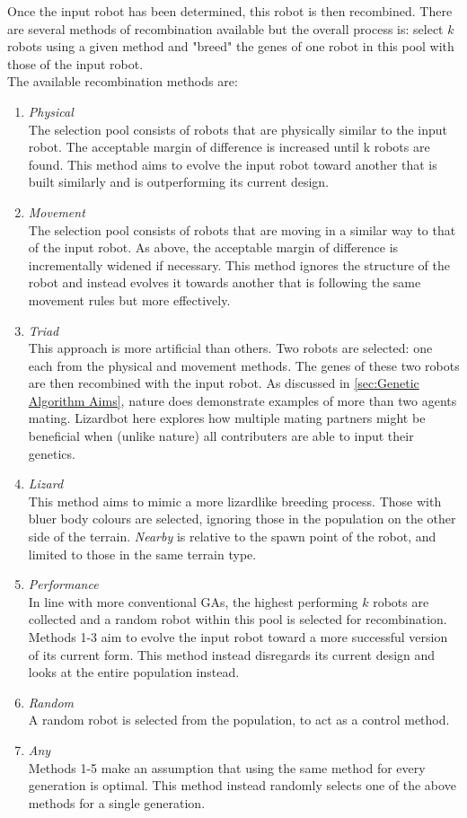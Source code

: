 \documentclass{article}
\begin{document}
Once the input robot has been determined, this robot is then recombined. There are several methods of recombination available but the overall process is: select $k$ robots using a given method and "breed" the genes of one robot in this pool with those of the input robot.\\
The available recombination methods are:
\begin{enumerate}
  \item \textit{Physical}\\
The selection pool consists of robots that are physically similar to the input robot. The acceptable margin of difference is increased until k robots are found. This method aims to evolve the input robot toward another that is built similarly and is outperforming its current design.
  \item \textit{Movement}\\
The selection pool consists of robots that are moving in a similar way to that of the input robot. As above, the acceptable margin of difference is incrementally widened if necessary. This method ignores the structure of the robot and instead evolves it towards another that is following the same movement rules but more effectively.
	\item \textit{Triad}\\
This approach is more artificial than others. Two robots are selected: one each from the physical and movement methods. The genes of these two robots are then recombined with the input robot. As discussed in \ref{sec:Genetic Algorithm Aims}, nature does demonstrate examples of more than two agents mating. Lizardbot here explores how multiple mating partners might be beneficial when (unlike nature) all contributers are able to input their genetics.
	\item \textit{Lizard}\\
This method aims to mimic a more lizardlike breeding process. Those with bluer body colours are selected, ignoring those in the population on the other side of the terrain. \textit{Nearby} is relative to the spawn point of the robot, and limited to those in the same terrain type. 
	\item \textit{Performance}\\
In line with more conventional GAs, the highest performing $k$ robots are collected and a random robot within this pool is selected for recombination. Methods 1-3 aim to evolve the input robot toward a more successful version of its current form. This method instead disregards its current design and looks at the entire population instead.
	\item \textit{Random}\\
A random robot is selected from the population, to act as a control method.
	\item \textit{Any}\\
Methods 1-5 make an assumption that using the same method for every generation is optimal. This method instead randomly selects one of the above methods for a single generation.\\
\end{enumerate}
\end{document}
